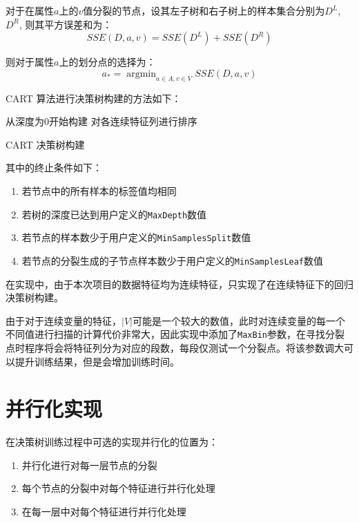 \documentclass[12pt]{article}
\begin{document}
对于在属性$a$上的$v$值分裂的节点，设其左子树和右子树上的样本集合分别为$D^L$, $D^R$, 则其平方误差和为：
\begin{equation}
    SSE(D, a, v)=SSE(D^L) + SSE(D^R)
\end{equation}

则对于属性$a$上的划分点的选择为：
\begin{equation}
    a_*=\mathop{\arg\min}_{a\in A, v \in V}SSE(D,a,v)
\end{equation}

CART 算法进行决策树构建的方法如下：

\begin{algorithm}[H]
    \SetAlgoLined
    从深度为0开始构建\;
    对各连续特征列进行排序\;

    \caption{CART 决策树构建}
\end{algorithm}

其中的终止条件如下：
\begin{enumerate}
    \item 若节点中的所有样本的标签值均相同
    \item 若树的深度已达到用户定义的\lstinline{MaxDepth}数值
    \item 若节点的样本数少于用户定义的\lstinline{MinSamplesSplit}数值
    \item 若节点的分裂生成的子节点样本数少于用户定义的\lstinline{MinSamplesLeaf}数值
\end{enumerate}

在实现中，由于本次项目的数据特征均为连续特征，只实现了在连续特征下的回归决策树构建。

由于对于连续变量的特征，$|V|$可能是一个较大的数值，此时对连续变量的每一个不同值进行扫描的计算代价非常大，因此实现中添加了\lstinline{MaxBin}参数，在寻找分裂点时程序将会将特征列分为对应的段数，每段仅测试一个分裂点。将该参数调大可以提升训练结果，但是会增加训练时间。

\section{并行化实现}
在决策树训练过程中可选的实现并行化的位置为\cite{fang_2015}：
\begin{enumerate}
    \item 并行化进行对每一层节点的分裂
    \item 每个节点的分裂中对每个特征进行并行化处理
    \item 在每一层中对每个特征进行并行化处理
\end{enumerate}
\end{document}
